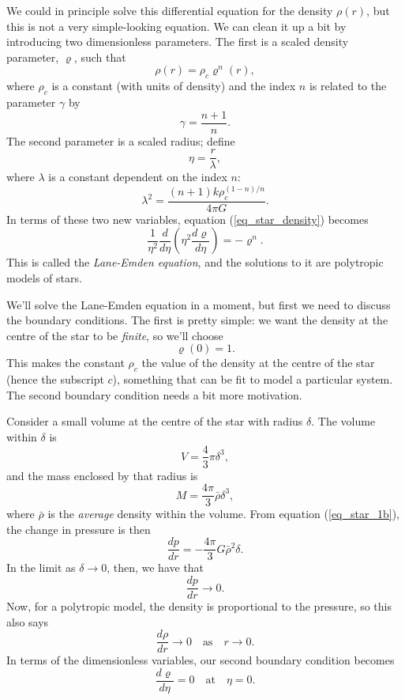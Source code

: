 We could in principle solve this differential equation for the density $\rho(r)$, but this is not a very simple-looking equation.  We can clean it up a bit by introducing two dimensionless parameters.  The first is a scaled density parameter, $\varrho$, such that
\begin{equation}
\label{eq_varrho}
\rho(r) = \rho_c \varrho^n(r),
\end{equation}
where $\rho_c$ is a constant (with units of density) and the index $n$ is related to the parameter $\gamma$ by
\begin{equation}
\gamma = \frac{n+1}{n}.
\end{equation}
The second parameter is a scaled radius; define 
\begin{equation}
\eta = \frac{r}{\lambda},
\end{equation}
where $\lambda$ is a constant dependent on the index $n$:
\begin{equation}
\lambda^2 = \frac{(n+1) k \rho_c^{(1-n)/n}}{4\pi G}.
\end{equation}
In terms of these two new variables, equation (\ref{eq_star_density}) becomes
\begin{equation}
\boxed{
\frac{1}{\eta^2} \frac{d}{d\eta} \left( \eta^2 \frac{d\varrho}{d\eta} \right) = - \varrho^n.
}
\end{equation}
This is called the \emph{Lane-Emden equation}, and the solutions to it are polytropic models of stars.

We'll solve the Lane-Emden equation in a moment, but first we need to discuss the boundary conditions.  The first is pretty simple: we want the density at the centre of the star to be \emph{finite}, so we'll choose
\begin{equation}
\varrho(0) = 1.
\end{equation}
This makes the constant $\rho_c$ the value of the density at the centre of the star (hence the subscript $c$), something that can be fit to model a particular system.  The second boundary condition needs a bit more motivation.  

Consider a small volume at the centre of the star with radius $\delta$.  The volume within $\delta$ is
\[
V = \frac{4}{3} \pi \delta^3,
\]
and the mass enclosed by that radius is
\[
M = \frac{4\pi}{3} \bar{\rho} \delta^3,
\]
where $\bar{\rho}$ is the \emph{average} density within the volume.  From equation (\ref{eq_star_1b}), the change in pressure is then
\[
\frac{dp}{dr} = -\frac{4\pi}{3} G \bar{\rho}^2 \delta.
\]
In the limit as $\delta \to 0$, then, we have that
\[
\frac{dp}{dr} \to 0.
\]
Now, for a polytropic model, the density is proportional to the pressure, so this also says
\[
\frac{d\rho}{dr} \to 0 \quad \text{as} \quad r \to 0.
\]
In terms of the dimensionless variables, our second boundary condition becomes
\begin{equation}
\frac{d\varrho}{d\eta} = 0 \quad \text{at} \quad \eta = 0.
\end{equation}

